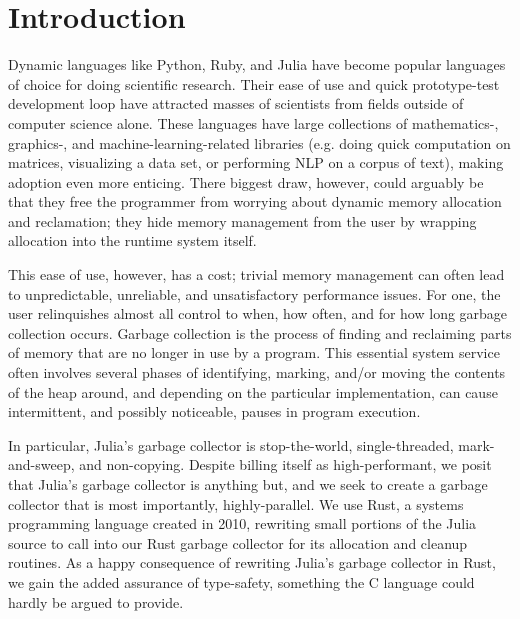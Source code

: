 \section{Introduction} \label{introduction}
Dynamic languages like Python, Ruby, and Julia have become popular languages of choice for doing scientific research.
Their ease of use and quick prototype-test development loop have attracted masses of scientists from fields outside of computer science alone.
These languages have large collections of mathematics-, graphics-, and machine-learning-related libraries (e.g. doing quick computation on matrices, visualizing a data set, or performing NLP on a corpus of text), making adoption even more enticing.
There biggest draw, however, could arguably be that they free the programmer from worrying about dynamic memory allocation and reclamation; they hide memory management from the user by wrapping allocation into the runtime system itself.

This ease of use, however, has a cost; trivial memory management can often lead to unpredictable, unreliable, and unsatisfactory performance issues.
For one, the user relinquishes almost all control to when, how often, and for how long garbage collection occurs.
Garbage collection is the process of finding and reclaiming parts of memory that are no longer in use by a program.
This essential system service often involves several phases of identifying, marking, and/or moving the contents of the heap around, and depending on the particular implementation, can cause intermittent, and possibly noticeable, pauses in program execution.

In particular, Julia's garbage collector is stop-the-world, single-threaded, mark-and-sweep, and non-copying.
Despite billing itself as high-performant, we posit that Julia's garbage collector is anything but, and we seek to create a garbage collector that is most importantly, highly-parallel.
We use Rust, a systems programming language created in 2010, rewriting small portions of the Julia source to call into our Rust garbage collector for its allocation and cleanup routines.
As a happy consequence of rewriting Julia's garbage collector in Rust, we gain the added assurance of type-safety, something the C language could hardly be argued to provide.


